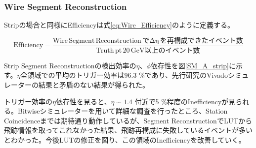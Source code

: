 \subsubsection{Wire Segment Reconstruction}
\par
Stripの場合と同様にEfficiencyは式\ref{eq:Wire_Efficiency}のように定義する。

\begin{equation}
    \mathrm {Efficiency} = \frac{\mathrm{Wire\,Segment \,Reconstruction\,で\Delta\eta\,を再構成できたイベント数}}{\mathrm{Truth\,pt \,20 \,GeV以上のイベント数}}
    \label{eq:Wire_Efficiency}
\end{equation}


Strip Segment Reconstructionの検出効率の$\eta$、$\phi$依存性を図\ref{SM_A_strip}に示す。$\eta$全領域での平均のトリガー効率は96.3 \%であり、先行研究のVivadoシミュレーターの結果と矛盾のない結果が得られた。

トリガー効率の$\eta$依存性を見ると、$\eta \sim 1.4$ 付近で5 \%程度のInefficiencyが見られる。Bitwiseシミュレーターを用いて詳細な調査を行ったところ、Station Coincidenceまでは期待通り動作しているが、Segment ReconstructionでLUTから飛跡情報を取ってこれなかった結果、飛跡再構成に失敗しているイベントが多いとわかった。今後LUTの修正を図り、この領域のInefficiencyを改善していく。

